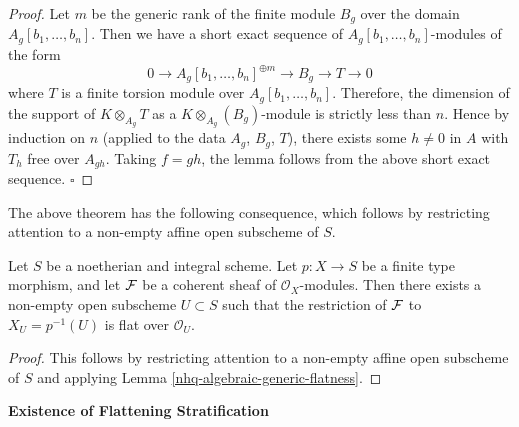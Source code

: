 \begin{proof}
Let $m$ be the generic rank of the finite module $B_g$ over the
domain $A_g[b_1,\ldots, b_n]$. Then we have a short exact
sequence of $A_g[b_1,\ldots, b_n]$-modules of the form
$$0\to A_g[b_1,\ldots, b_n]^{\oplus m} \to B_g \to T \to 0$$
where $T$ is a finite torsion module over $A_g[b_1,\ldots, b_n]$.
Therefore, the dimension of the support of $K\otimes_{A_g}T$
as a $K\otimes_{A_g}(B_g)$-module is strictly less than $n$. Hence by
induction on $n$ (applied to the data $A_g$, $B_g$, $T$),
there exists some $h\ne 0$ in $A$ with $T_h$ free over $A_{gh}$.
Taking $f=gh$, the lemma follows from the
above short exact sequence.
\hfill$\square$\end{proof}



The above theorem has the following consequence, which follows
by restricting attention to a non-empty affine open subscheme of $S$.



\begin{theorem}\label{nhq-generic-flatness}
Let $S$ be a noetherian and integral scheme.
Let $p: X\to S$ be a finite type morphism, and let $\mathcal{F}$ be a
coherent sheaf of ${\mathcal O}_X$-modules. Then there exists a non-empty
open subscheme $U\subset S$ such that the restriction of $\mathcal{F}$
to $X_U = p^{-1}(U)$ is flat over ${\mathcal O}_U$.
\end{theorem}

\begin{proof}
This follows by restricting attention to a non-empty affine open subscheme of $S$ and applying Lemma \ref{nhq-algebraic-generic-flatness}.
\end{proof}













\centerline{\large\bf Existence of Flattening Stratification}

\medskip

